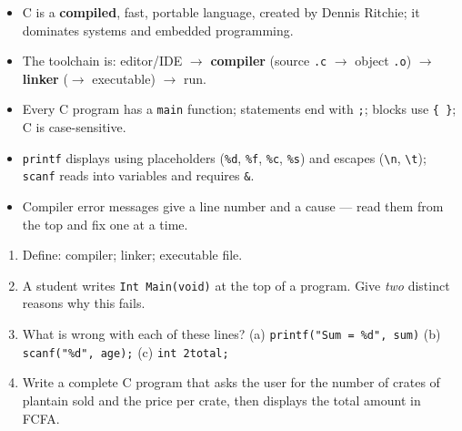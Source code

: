 \documentclass[11pt]{article}
\begin{document}
\begin{aretenir}
\begin{itemize}
\item C is a \textbf{compiled}, fast, portable language, created by Dennis Ritchie; it dominates systems and embedded programming.
\item The toolchain is: editor/IDE $\rightarrow$ \textbf{compiler} (source \texttt{.c} $\rightarrow$ object \texttt{.o}) $\rightarrow$ \textbf{linker} ($\rightarrow$ executable) $\rightarrow$ run.
\item Every C program has a \texttt{main} function; statements end with \texttt{;}; blocks use \texttt{\{ \}}; C is case-sensitive.
\item \texttt{printf} displays using placeholders (\texttt{\%d}, \texttt{\%f}, \texttt{\%c}, \texttt{\%s}) and escapes (\texttt{\textbackslash n}, \texttt{\textbackslash t}); \texttt{scanf} reads into variables and requires \texttt{\&}.
\item Compiler error messages give a line number and a cause — read them from the top and fix one at a time.
\end{itemize}
\end{aretenir}

\begin{exercice}
\begin{enumerate}
\item Define: compiler; linker; executable file.
\item A student writes \texttt{Int Main(void)} at the top of a program. Give \emph{two} distinct reasons why this fails.
\item What is wrong with each of these lines? (a) \texttt{printf("Sum = \%d", sum)} (b) \texttt{scanf("\%d", age);} (c) \texttt{int 2total;}
\item Write a complete C program that asks the user for the number of crates of plantain sold and the price per crate, then displays the total amount in FCFA.
\end{enumerate}
\end{exercice}
\end{document}
